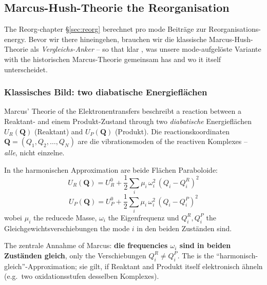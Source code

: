 \documentclass[11pt,a4paper,twoside]{article}
\theoremstyle{remark}
\begin{document}

\subsection{Marcus-Hush-Theorie the Reorganisation}
\label{sec:marcus-hush}

The Reorg-chapter \S\ref{sec:reorg} berechnet pro mode Beitr\"age zur
Reorganisations-energy. Bevor wir there hineingehen, brauchen wir die
klassische Marcus-Hush-Theorie als \emph{Vergleichs-Anker} -- so that klar
, was unsere mode-aufgel\"oste Variante with the historischen
Marcus-Theorie gemeinsam has and wo it itself unterscheidet.

\subsubsection*{Klassisches Bild: two diabatische Energiefl\"achen}

Marcus' Theorie of the Elektronentransfers \cite{Marcus1956,Marcus1993}
beschreibt a reaction between a Reaktant- and einem
Produkt-Zustand through two \emph{diabatische} Energiefl\"achen
$U_R(\mathbf{Q})$ (Reaktant) and $U_P(\mathbf{Q})$ (Produkt). Die
reactionskoordinaten $\mathbf{Q} = (Q_1, Q_2, \ldots, Q_N)$ are die
vibrationsmoden of the reactiven Komplexes -- \emph{alle}, nicht
einzelne.

In the harmonischen Approximation are beide Fl\"achen Paraboloide:
\begin{equation}
  U_R(\mathbf{Q}) = U_R^0 + \frac{1}{2}\sum_i \mu_i\,\omega_i^2\,
                       (Q_i - Q_i^R)^2
\end{equation}
\begin{equation}
  U_P(\mathbf{Q}) = U_P^0 + \frac{1}{2}\sum_i \mu_i\,\omega_i^2\,
                       (Q_i - Q_i^P)^2
\end{equation}
wobei $\mu_i$ the reducede Masse, $\omega_i$ the Eigenfrequenz und
$Q_i^R, Q_i^P$ the Gleichgewichtsverschiebungen the mode $i$ in den
beiden Zust\"anden sind.

The zentrale Annahme of Marcus: \textbf{die frequencies $\omega_i$
sind in beiden Zust\"anden gleich}, only the Verschiebungen
$Q_i^R \neq Q_i^P$. The is the "`harmonisch-gleich"'-Approximation;
sie gilt, if Reaktant and Produkt itself elektronisch \"ahneln (e.g.\
two oxidationsstufen desselben Komplexes).
\end{document}
